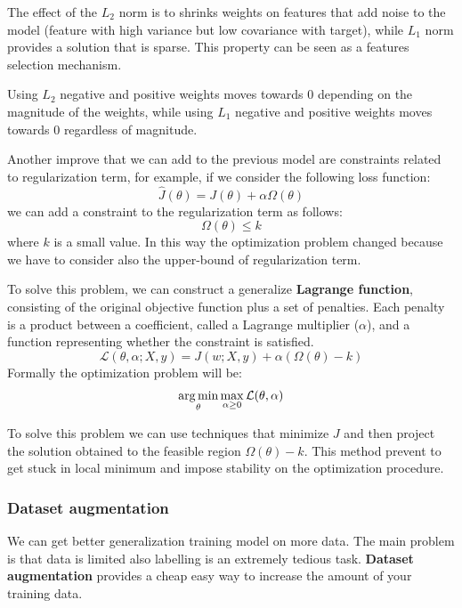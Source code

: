 The effect of the $L_2$ norm is to shrinks weights on features that add noise to
the model (feature with high variance but low covariance with target), while
$L_1$ norm provides a solution that is sparse. This property can be seen as a
features selection mechanism.
\begin{note}
    Using $L_2$ negative and positive weights moves towards 0 depending on the
    magnitude of the weights, while using $L_1$ negative and positive weights
    moves towards 0 regardless of magnitude.
\end{note}

Another improve that we can add to the previous model are constraints related to
regularization term, for example, if we consider the following loss function:
\begin{equation}
    \hat{J}(\theta) = J(\theta) + \alpha \Omega(\theta)
\end{equation}
we can add a constraint to the regularization term as follows:
\begin{equation}
    \Omega(\theta) \le k
\end{equation}
where $k$ is a small value. In this way the optimization problem changed because
we have to consider also the upper-bound of regularization term.

To solve this problem, we can construct a generalize \textbf{Lagrange function},
consisting of the original objective function plus a set of penalties. Each
penalty is a product between a coefficient, called a Lagrange multiplier ($\alpha$),
and a function representing whether the constraint is satisfied.
\begin{equation}
    \mathcal{L}(\theta, \alpha; X,y) = J(w;X,y)+ \alpha(\Omega(\theta)-k)
\end{equation}
Formally the optimization problem will be:
\begin{equation}
    \operatorname*{arg\,min}_\theta \max_{\alpha \geq 0} \mathcal{L}(\theta, \alpha)
\end{equation}

To solve this problem we can use techniques that minimize $J$ and then project
the solution obtained to the feasible region $\Omega(\theta) - k$. This method
prevent to get stuck in local minimum and impose stability on the optimization
procedure.
\subsubsection{Dataset augmentation}
We can get better generalization training model on more data. The main problem is
that data is limited also labelling is an extremely tedious task. \textbf{Dataset
    augmentation} provides a cheap easy way to increase the amount of your
training data.

